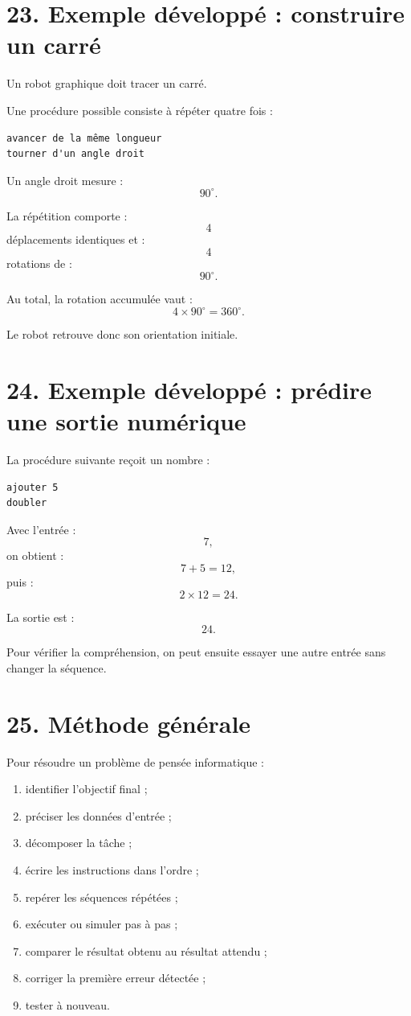 \section{23. Exemple développé : construire un carré}

Un robot graphique doit tracer un carré.

Une procédure possible consiste à répéter quatre fois :
\begin{verbatim}
avancer de la même longueur
tourner d'un angle droit
\end{verbatim}

Un angle droit mesure :
\[
90^\circ.
\]

La répétition comporte :
\[
4
\]
déplacements identiques et :
\[
4
\]
rotations de :
\[
90^\circ.
\]

Au total, la rotation accumulée vaut :
\[
4\times90^\circ=360^\circ.
\]

Le robot retrouve donc son orientation initiale.

\section{24. Exemple développé : prédire une sortie numérique}

La procédure suivante reçoit un nombre :
\begin{verbatim}
ajouter 5
doubler
\end{verbatim}

Avec l'entrée :
\[
7,
\]
on obtient :
\[
7+5=12,
\]
puis :
\[
2\times12=24.
\]

La sortie est :
\[
\boxed{24}.
\]

Pour vérifier la compréhension, on peut ensuite essayer une autre entrée sans changer la séquence.

\section{25. Méthode générale}

\begin{methode}
Pour résoudre un problème de pensée informatique :
\begin{enumerate}
\item identifier l'objectif final ;
\item préciser les données d'entrée ;
\item décomposer la tâche ;
\item écrire les instructions dans l'ordre ;
\item repérer les séquences répétées ;
\item exécuter ou simuler pas à pas ;
\item comparer le résultat obtenu au résultat attendu ;
\item corriger la première erreur détectée ;
\item tester à nouveau.
\end{enumerate}
\end{methode}


